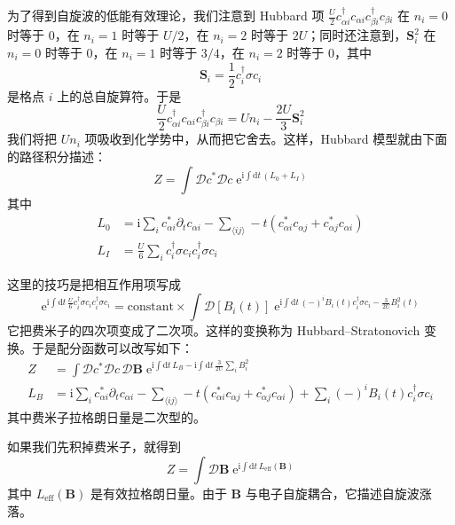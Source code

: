 为了得到自旋波的低能有效理论，我们注意到 Hubbard 项 $\frac{U}{2}c^{\dagger}_{\alpha i}c_{\alpha i}c^{\dagger}_{\beta i}c_{\beta i}$ 在 $n_{i}=0$ 时等于 0，在 $n_{i}=1$ 时等于 $U/2$，在 $n_{i}=2$ 时等于 $2U$；同时还注意到，$\pmb{S}^{2}_{i}$ 在 $n_{i}=0$ 时等于 0，在 $n_{i}=1$ 时等于 $3/4$，在 $n_{i}=2$ 时等于 0，其中
\begin{equation*}
\pmb{S}_{i}=\frac{1}{2}c^{\dagger}_{i}\sigma c_{i}
\end{equation*}
是格点 $i$ 上的总自旋算符。于是
\begin{equation*}
\frac{U}{2}c^{\dagger}_{\alpha i}c_{\alpha i}c^{\dagger}_{\beta i}c_{\beta i}=Un_{i}-\frac{2U}{3}\pmb{S}^{2}_{i}
\end{equation*}
我们将把 $Un_{i}$ 项吸收到化学势中，从而把它舍去。这样，Hubbard 模型就由下面的路径积分描述：
\begin{equation*}
Z=\int \mathcal{D}c^{*}\mathcal{D}c\;\mathrm{e}^{\mathrm{i}\int \mathrm{d}t\,(L_{0}+L_{I})}
\end{equation*}
其中
\begin{align*}
L_{0}&=\mathrm{i}\sum_{i}c^{*}_{\alpha i}\partial_{t}c_{\alpha i}-\sum_{\langle ij\rangle}-t(c^{*}_{\alpha i}c_{\alpha j}+c^{*}_{\alpha j}c_{\alpha i})\\
L_{I}&=\frac{U}{6}\sum_{i}c^{\dagger}_{i}\sigma c_{i}c^{\dagger}_{i}\sigma c_{i}
\end{align*}

这里的技巧是把相互作用项写成
\begin{equation*}
\mathrm{e}^{\mathrm{i}\int \mathrm{d}t\,\frac{U}{6}c^{\dagger}_{i}\sigma c_{i}c^{\dagger}_{i}\sigma c_{i}}=\text{constant}\times\int \mathcal{D}[B_{i}(t)]\;\mathrm{e}^{\mathrm{i}\int \mathrm{d}t\,(-)^{i}B_{i}(t)c^{\dagger}_{i}\sigma c_{i}-\frac{3}{2U}B^{2}_{i}(t)}
\end{equation*}
它把费米子的四次项变成了二次项。这样的变换称为 Hubbard--Stratonovich 变换。于是配分函数可以改写如下：
\begin{align*}
Z&=\int \mathcal{D}c^{*}\mathcal{D}c\,\mathcal{D}\pmb{B}\;\mathrm{e}^{\mathrm{i}\int \mathrm{d}t\,L_{B}-\mathrm{i}\int \mathrm{d}t\,\frac{3}{2U}\sum_{i}B^{2}_{i}} \tag{5.6.1}\\
L_{B}&=\mathrm{i}\sum_{i}c^{*}_{\alpha i}\partial_{t}c_{\alpha i}-\sum_{\langle ij\rangle}-t(c^{*}_{\alpha i}c_{\alpha j}+c^{*}_{\alpha j}c_{\alpha i})+\sum_{i}(-)^{i}B_{i}(t)c^{\dagger}_{i}\sigma c_{i}
\end{align*}
其中费米子拉格朗日量是二次型的。

如果我们先积掉费米子，就得到
\begin{equation*}
Z=\int \mathcal{D}\pmb{B}\;\mathrm{e}^{\mathrm{i}\int \mathrm{d}t\,L_{\mathrm{eff}}(\pmb{B})}
\end{equation*}
其中 $L_{\mathrm{eff}}(\pmb{B})$ 是有效拉格朗日量。由于 $\pmb{B}$ 与电子自旋耦合，它描述自旋波涨落。

